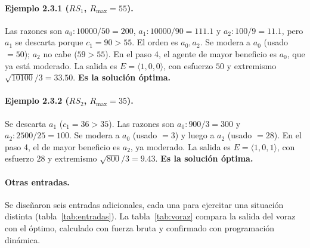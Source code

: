 \documentclass[11pt,letterpaper]{article}
\newcommand{\E}[1]{\ensuremath{\langle #1 \rangle}}
\newcommand{\Rmax}{R_{\max}}
\begin{document}
\paragraph{Ejemplo 2.3.1 ($RS_1$, $\Rmax = 55$).} Las razones son
$a_0: 10000/50 = 200$, $a_1: 10000/90 = 111.1$ y $a_2: 100/9 = 11.1$, pero
$a_1$ se descarta porque $c_1 = 90 > 55$. El orden es $a_0, a_2$. Se modera a
$a_0$ (usado $= 50$); $a_2$ no cabe ($59 > 55$). En el paso 4, el agente de
mayor beneficio es $a_0$, que ya está moderado. La salida es $E = \E{1,0,0}$,
con esfuerzo $50$ y extremismo $\sqrt{10100}/3 = 33.50$. \textbf{Es la
solución óptima.}

\paragraph{Ejemplo 2.3.2 ($RS_2$, $\Rmax = 35$).} Se descarta $a_1$
($c_1 = 36 > 35$). Las razones son $a_0: 900/3 = 300$ y $a_2: 2500/25 = 100$.
Se modera a $a_0$ (usado $= 3$) y luego a $a_2$ (usado $= 28$). En el paso 4,
el de mayor beneficio es $a_2$, ya moderado. La salida es $E = \E{1,0,1}$,
con esfuerzo $28$ y extremismo $\sqrt{800}/3 = 9.43$. \textbf{Es la solución
óptima.}

\paragraph{Otras entradas.} Se diseñaron seis entradas adicionales, cada una
para ejercitar una situación distinta (tabla~\ref{tab:entradas}). La
tabla~\ref{tab:voraz} compara la salida del voraz con el óptimo, calculado con
fuerza bruta y confirmado con programación dinámica.
\end{document}
